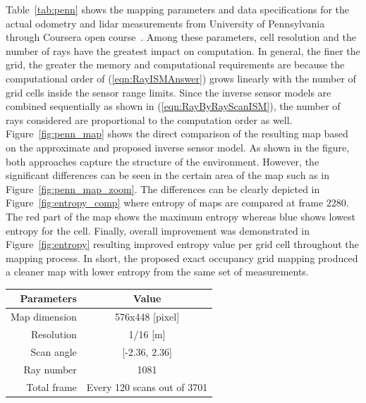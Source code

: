 \documentclass[smallextended]{svjour3}       %
\newcommand{\refeqn}[1]{(\ref{eqn:#1})}
\begin{document}
Table~\ref{tab:penn} shows the mapping parameters and data specifications for the actual odometry and lidar measurements from University of Pennsylvania through Coursera open course~\cite{coursera}. Among these parameters, cell resolution and the number of rays have the greatest impact on computation. In general, the finer the grid, the greater the memory and computational requirements are because the computational order of \refeqn{RayISMAnswer} grows linearly with the number of grid cells inside the sensor range limits. Since the inverse sensor models are combined sequentially as shown in \refeqn{RayByRayScanISM}, the number of rays considered are proportional to the computation order as well.
Figure~\ref{fig:penn_map} shows the direct comparison of the resulting map based on the approximate and proposed inverse sensor model.
As shown in the figure, both approaches capture the structure of the environment. However, the significant differences can be seen in the certain area of the map such as in Figure~\ref{fig:penn_map_zoom}.
The differences can be clearly depicted in Figure~\ref{fig:entropy_comp} where entropy of maps are compared at frame 2280.
The red part of the map shows the maximum  entropy whereas blue shows lowest entropy for the cell.
Finally, overall improvement was demonstrated in Figure~\ref{fig:entropy} resulting improved entropy value per grid cell throughout the mapping process.
In short, the proposed exact occupancy grid mapping produced a cleaner map with lower entropy from the same set of measurements.

\begin{center}
\label{tab:penn}
    \begin{tabular}{r | c}
        Parameters & Value\\ \hline\hline
        Map dimension & 576x448 [pixel]\\
        Resolution & 1/16 [m]\\
        Scan angle & [-2.36, 2.36]\\
        Ray number & 1081\\
        Total frame & Every 120 scans out of 3701\\
    \end{tabular}
\end{center}
\end{document}
